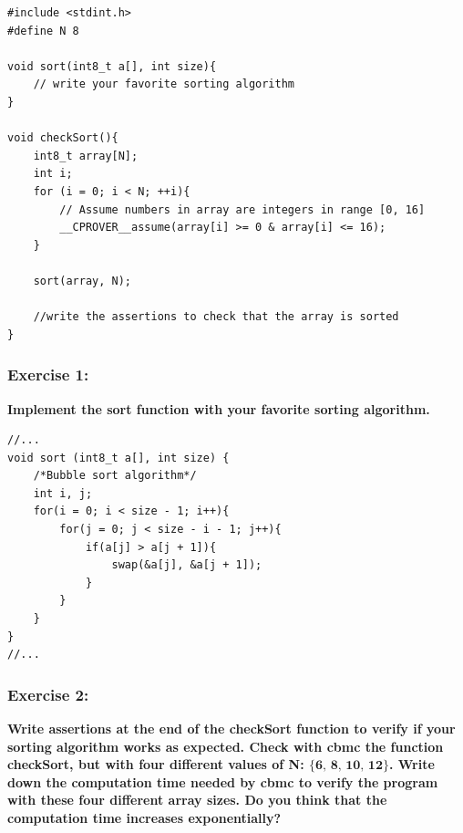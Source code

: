 \documentclass[a4paper,12pt]{article}
\begin{document}
\begin{lstlisting}
#include <stdint.h>
#define N 8

void sort(int8_t a[], int size){
    // write your favorite sorting algorithm
}

void checkSort(){
    int8_t array[N];
    int i;
    for (i = 0; i < N; ++i){
        // Assume numbers in array are integers in range [0, 16]
        __CPROVER__assume(array[i] >= 0 & array[i] <= 16);
    }
    
    sort(array, N);
    
    //write the assertions to check that the array is sorted
}
\end{lstlisting}

\subsubsection{Exercise 1:}
\textbf{Implement the sort function with your favorite sorting algorithm.}


\begin{lstlisting}
//...
void sort (int8_t a[], int size) {
	/*Bubble sort algorithm*/
	int i, j;
	for(i = 0; i < size - 1; i++){
		for(j = 0; j < size - i - 1; j++){
			if(a[j] > a[j + 1]){
				swap(&a[j], &a[j + 1]);
			}
		}
	}
}
//...
\end{lstlisting}

\subsubsection{Exercise 2:}
\textbf{Write assertions at the end of the checkSort function to verify if your sorting algorithm works as expected. Check with cbmc the function checkSort, but with four different values of N: $\{ \textbf{6, 8, 10, 12} \}$. Write down the computation time needed by cbmc to verify the program with these four different array sizes. Do you think that the computation time increases exponentially?}

\end{document}

